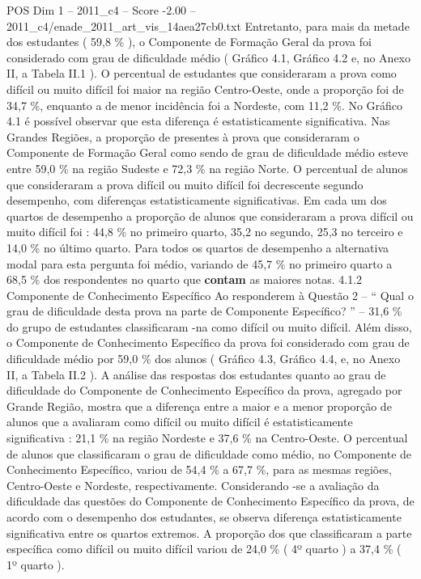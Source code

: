 \begin{textsample}{POS Dim 1 – 2011\_c4 – Score -2.00 – 2011\_c4/enade\_2011\_art\_vis\_14aea27cb0.txt}
Entretanto, para mais da metade dos estudantes ( 59,8 \% ), o Componente de Formação Geral da prova foi considerado com grau de dificuldade médio ( Gráfico 4.1, Gráfico 4.2 e, no Anexo II, a Tabela II.1 ).
O percentual de estudantes que consideraram a prova como difícil ou muito difícil foi maior na região Centro-Oeste, onde a proporção foi de 34,7 \%, enquanto a de menor incidência foi a Nordeste, com 11,2 \%.
No Gráfico 4.1 é possível observar que esta diferença é estatisticamente significativa.
Nas Grandes Regiões, a proporção de presentes à prova que consideraram o Componente de Formação Geral como sendo de grau de dificuldade médio esteve entre 59,0 \% na região Sudeste e 72,3 \% na região Norte.
O percentual de alunos que consideraram a prova difícil ou muito difícil foi decrescente segundo desempenho, com diferenças estatisticamente significativas.
Em cada um dos quartos de desempenho a proporção de alunos que consideraram a prova difícil ou muito difícil foi : 44,8 \% no primeiro quarto, 35,2 no segundo, 25,3 no terceiro e 14,0 \% no último quarto.
Para todos os quartos de desempenho a alternativa modal para esta pergunta foi médio, variando de 45,7 \% no primeiro quarto a 68,5 \% dos respondentes no quarto que \textbf{contam} as maiores notas. 4.1.2 Componente de Conhecimento Específico Ao responderem à Questão 2 – “ Qual o grau de dificuldade desta prova na parte de Componente Específico? ” – 31,6 \% do grupo de estudantes classificaram -na como difícil ou muito difícil.
Além disso, o Componente de Conhecimento Específico da prova foi considerado com grau de dificuldade médio por 59,0 \% dos alunos ( Gráfico 4.3, Gráfico 4.4, e, no Anexo II, a Tabela II.2 ).
A análise das respostas dos estudantes quanto ao grau de dificuldade do Componente de Conhecimento Específico da prova, agregado por Grande Região, mostra que a diferença entre a maior e a menor proporção de alunos que a avaliaram como difícil ou muito difícil é estatisticamente significativa : 21,1 \% na região Nordeste e 37,6 \% na Centro-Oeste.
O percentual de alunos que classificaram o grau de dificuldade como médio, no Componente de Conhecimento Específico, variou de 54,4 \% a 67,7 \%, para as mesmas regiões, Centro-Oeste e Nordeste, respectivamente.
Considerando -se a avaliação da dificuldade das questões do Componente de Conhecimento Específico da prova, de acordo com o desempenho dos estudantes, se observa diferença estatisticamente significativa entre os quartos extremos.
A proporção dos que classificaram a parte específica como difícil ou muito difícil variou de 24,0 \% ( 4º quarto ) a 37,4 \% ( 1º quarto ).

\end{textsample}
